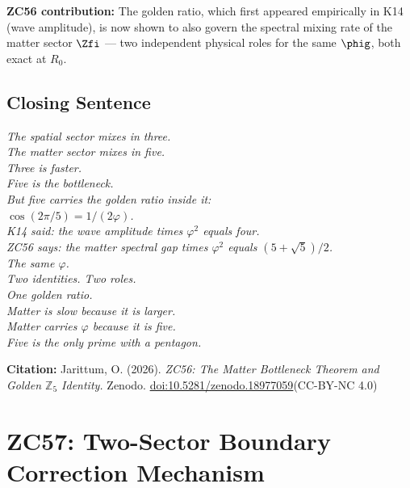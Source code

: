 \documentclass[12pt, a4paper]{article}
\begin{document}
\begin{genealogybox}
\medskip
\textbf{ZC56 contribution:}
The golden ratio, which first appeared empirically in K14
(wave amplitude), is now shown to also govern the spectral
mixing rate of the matter sector $\Zfi$ --- two independent
physical roles for the same $\phig$, both exact at $R_0$.
\end{genealogybox}

\subsection{Closing Sentence}

\begin{center}
\textit{%
  The spatial sector mixes in three.\\
  The matter sector mixes in five.\\[0.5em]
  Three is faster.\\
  Five is the bottleneck.\\[0.5em]
  But five carries the golden ratio inside it:\\
  $\cos(2\pi/5) = 1/(2\varphi)$.\\[0.5em]
  K14 said: the wave amplitude times $\varphi^2$ equals four.\\
  ZC56 says: the matter spectral gap times $\varphi^2$
  equals $(5+\sqrt{5})/2$.\\[0.3em]
  The same $\varphi$.\\
  Two identities. Two roles.\\
  One golden ratio.\\[0.5em]
  Matter is slow because it is larger.\\
  Matter carries $\varphi$ because it is five.\\
  Five is the only prime with a pentagon.}
\end{center}

\bigskip
\begin{center}
\textbf{Citation:} Jarittum, O. (2026).
\textit{ZC56: The Matter Bottleneck Theorem and
Golden $\mathbb{Z}_5$ Identity.}
Zenodo.
\href{https://doi.org/10.5281/zenodo.18977059}%
{doi:10.5281/zenodo.18977059}\quad (CC-BY-NC 4.0)
\end{center}


\section{ZC57: Two-Sector Boundary Correction Mechanism}
\end{document}
